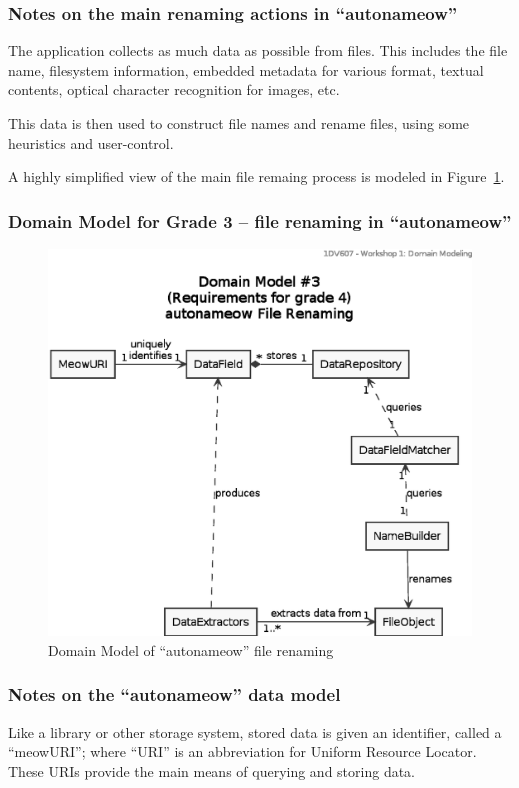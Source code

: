 \subsubsection{Notes on the main renaming actions in ``autonameow''}
The application collects as much data as possible from files. This includes the
file name, filesystem information, embedded metadata for various format,
textual contents, optical character recognition for images, etc. 

This data is then used to construct file names and rename files, using some
heuristics and user-control.

A highly simplified view of the main file remaing process is modeled in
Figure~\ref{fig:uml-domain3a}.


\subsubsection{Domain Model for Grade 3 -- file renaming in ``autonameow''}
\begin{figure}[htbp]
  \centering
  \includegraphics[width=\linewidth]{uml/domain-model_3a.eps}
  \caption{Domain Model of ``autonameow'' file renaming}
  \label{fig:uml-domain3a}
\end{figure}


\subsubsection{Notes on the ``autonameow'' data model}
Like a library or other storage system, stored data is given an identifier,
called a ``meowURI''; where ``URI'' is an abbreviation for Uniform Resource
Locator. These URIs provide the main means of querying and storing data.

